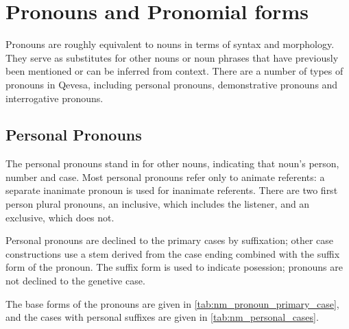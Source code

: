 \documentclass[grammar]{subfiles}
\begin{document}



  \section{Pronouns and Pronomial forms}
  \label{sec:nm_pronouns}

  Pronouns are roughly equivalent to nouns in terms of syntax and morphology.
  They serve as substitutes for other nouns or noun phrases that have
  previously been mentioned or can be inferred from context.  There are a
  number of types of pronouns in Qevesa, including personal pronouns,
  demonstrative pronouns and interrogative pronouns.


  \subsection{Personal Pronouns}
  \label{ssec:nm_personal_pronouns}

  The personal pronouns stand in for other nouns, indicating that noun's
  person, number and case.  Most personal pronouns refer only to animate
  referents: a separate inanimate pronoun is used for inanimate referents.
  There are two first person plural pronouns, an inclusive, which includes the
  listener, and an exclusive, which does not. 

  Personal pronouns are declined to the primary cases by suffixation; other
  case constructions use a stem derived from the case ending combined with the
  suffix form of the pronoun.  The suffix form is used to indicate posession;
  pronouns are not declined to the genetive case.  

  The base forms of the pronouns are given in
  \cref{tab:nm_pronoun_primary_case}, and the cases with personal suffixes
  are given in \cref{tab:nm_personal_cases}.
\end{document}
